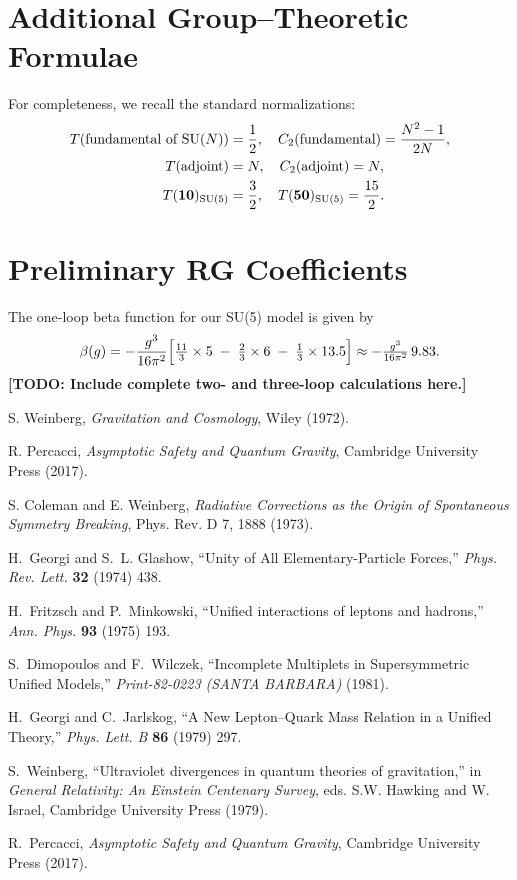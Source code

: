 \documentclass[aps,prd,preprint,groupedaddress]{revtex4-2}
\newcommand{\todo}[1]{\textbf{[TODO: #1]}}
\begin{document}
\section{Additional Group--Theoretic Formulae}
For completeness, we recall the standard normalizations:
\begin{align}
T(\text{fundamental of SU}(N)) &= \frac{1}{2}, \quad C_2(\text{fundamental})=\frac{N^2-1}{2N}, \\
T(\text{adjoint}) &= N,\quad C_2(\text{adjoint}) = N, \\
T(\mathbf{10})_{\rm SU(5)} &= \frac{3}{2},\quad T(\mathbf{50})_{\rm SU(5)} = \frac{15}{2}.
\end{align}

\section{Preliminary RG Coefficients}
The one-loop beta function for our SU(5) model is given by
\[
\beta(g)=-\frac{g^3}{16\pi^2}\Bigl[
  \tfrac{11}{3}\times 5 \;-\; \tfrac{2}{3}\times6 \;-\; \tfrac{1}{3}\times13.5
\Bigr]\approx -\tfrac{g^3}{16\pi^2}\,9.83.
\]
\todo{Include complete two- and three-loop calculations here.}



\begin{thebibliography}{9}

 S. Weinberg, \emph{Gravitation and Cosmology}, Wiley (1972).

 R. Percacci, \emph{Asymptotic Safety and Quantum Gravity}, Cambridge University Press (2017).

 S. Coleman and E. Weinberg, \emph{Radiative Corrections as the Origin of Spontaneous Symmetry Breaking}, Phys. Rev. D 7, 1888 (1973).

H.~Georgi and S.~L. Glashow,
``Unity of All Elementary-Particle Forces,''
\emph{Phys. Rev. Lett.} \textbf{32} (1974) 438.

H.~Fritzsch and P.~Minkowski,
``Unified interactions of leptons and hadrons,''
\emph{Ann. Phys.} \textbf{93} (1975) 193.

S.~Dimopoulos and F.~Wilczek,
``Incomplete Multiplets in Supersymmetric Unified Models,''
\emph{Print-82-0223 (SANTA BARBARA)} (1981).

H.~Georgi and C.~Jarlskog,
``A New Lepton--Quark Mass Relation in a Unified Theory,''
\emph{Phys. Lett. B} \textbf{86} (1979) 297.

S.~Weinberg,
``Ultraviolet divergences in quantum theories of gravitation,''
in \emph{General Relativity: An Einstein Centenary Survey},
eds. S.W. Hawking and W. Israel, Cambridge University Press (1979).

R.~Percacci,
\emph{Asymptotic Safety and Quantum Gravity},
Cambridge University Press (2017).

\end{thebibliography}
\end{document}
